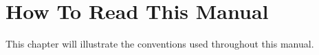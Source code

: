 
\chapter{How To Read This Manual}
\label{chp-howtoread}

This chapter will illustrate the conventions used
throughout this manual.

